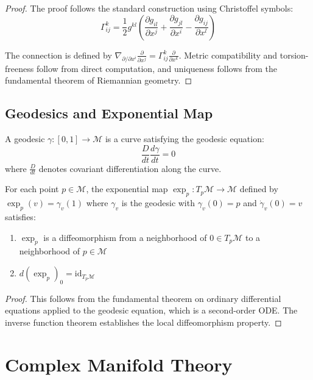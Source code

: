 \begin{proof}
The proof follows the standard construction using Christoffel symbols:
$$\Gamma^k_{ij} = \frac{1}{2} g^{kl} \left( \frac{\partial g_{il}}{\partial x^j} + \frac{\partial g_{jl}}{\partial x^i} - \frac{\partial g_{ij}}{\partial x^l} \right)$$

The connection is defined by $\nabla_{\partial/\partial x^i} \frac{\partial}{\partial x^j} = \Gamma^k_{ij} \frac{\partial}{\partial x^k}$. Metric compatibility and torsion-freeness follow from direct computation, and uniqueness follows from the fundamental theorem of Riemannian geometry.
\end{proof}

\subsection{Geodesics and Exponential Map}

\begin{definition}
\label{def:geodesics}
A geodesic $\gamma: [0,1] \to \mathcal{M}$ is a curve satisfying the geodesic equation:
$$\frac{D}{dt}\frac{d\gamma}{dt} = 0$$
where $\frac{D}{dt}$ denotes covariant differentiation along the curve.
\end{definition}

\begin{theorem}
\label{thm:exponential_map}
For each point $p \in \mathcal{M}$, the exponential map $\exp_p: T_p\mathcal{M} \to \mathcal{M}$ defined by $\exp_p(v) = \gamma_v(1)$ where $\gamma_v$ is the geodesic with $\gamma_v(0) = p$ and $\dot{\gamma}_v(0) = v$ satisfies:
\begin{enumerate}
\item $\exp_p$ is a diffeomorphism from a neighborhood of $0 \in T_p\mathcal{M}$ to a neighborhood of $p \in \mathcal{M}$
\item $d(\exp_p)_0 = \text{id}_{T_p\mathcal{M}}$
\end{enumerate}
\end{theorem}

\begin{proof}
This follows from the fundamental theorem on ordinary differential equations applied to the geodesic equation, which is a second-order ODE. The inverse function theorem establishes the local diffeomorphism property.
\end{proof}

\section{Complex Manifold Theory}

